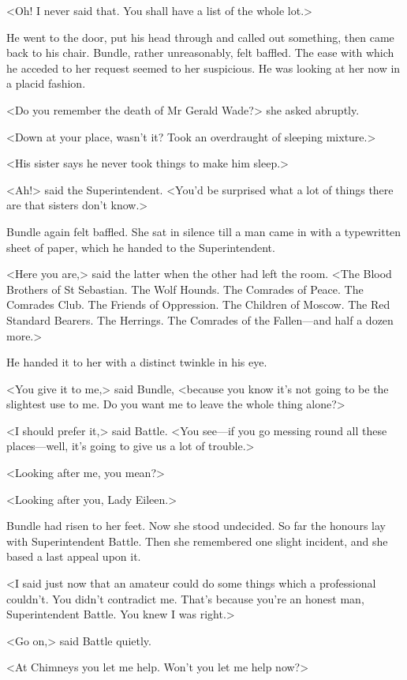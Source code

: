 <Oh! I never said that. You shall have a list of the whole lot.>

He went to the door, put his head through and called out something, then came back to his chair. Bundle, rather unreasonably, felt baffled. The ease with which he acceded to her request seemed to her suspicious. He was looking at her now in a placid fashion.

<Do you remember the death of Mr Gerald Wade?> she asked abruptly.

<Down at your place, wasn't it? Took an overdraught of sleeping mixture.>

<His sister says he never took things to make him sleep.>

<Ah!> said the Superintendent. <You'd be surprised what a lot of things there are that sisters don't know.>

Bundle again felt baffled. She sat in silence till a man came in with a typewritten sheet of paper, which he handed to the Superintendent.

<Here you are,> said the latter when the other had left the room. <The Blood Brothers of St Sebastian. The Wolf Hounds. The Comrades of Peace. The Comrades Club. The Friends of Oppression. The Children of Moscow. The Red Standard Bearers. The Herrings. The Comrades of the Fallen—and half a dozen more.>

He handed it to her with a distinct twinkle in his eye.

<You give it to me,> said Bundle, <because you know it's not going to be the slightest use to me. Do you want me to leave the whole thing alone?>

<I should prefer it,> said Battle. <You see—if you go messing round all these places—well, it's going to give us a lot of trouble.>

<Looking after me, you mean?>

<Looking after you, Lady Eileen.>

Bundle had risen to her feet. Now she stood undecided. So far the honours lay with Superintendent Battle. Then she remembered one slight incident, and she based a last appeal upon it.

<I said just now that an amateur could do some things which a professional couldn't. You didn't contradict me. That's because you're an honest man, Superintendent Battle. You knew I was right.>

<Go on,> said Battle quietly.

<At Chimneys you let me help. Won't you let me help now?>

